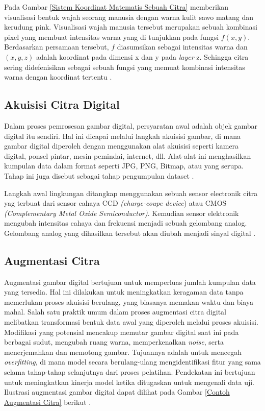     
    
    Pada Gambar \ref{Sistem Koordinat Matematis Sebuah Citra} memberikan visualisasi bentuk wajah seorang manusia dengan warna kulit sawo matang dan kerudung pink. Visualisasi wajah manusia tersebut merupakan sebuah kombinasi pixel yang membuat intensitas warna yang di tunjukkan pada fungsi $f(x,y)$. Berdasarkan persamaan tersebut, $f$ diasumsikan sebagai intensitas warna dan $(x,y,z)$ adalah koordinat pada dimensi x dan y pada \textit{layer} z. Sehingga citra sering didefenisikan sebagai sebuah fungsi yang memuat kombinasi intensitas warna dengan koordinat tertentu \cite{Kirana2021}.

\subsection{Akuisisi Citra  Digital}

    Dalam proses pemrosesan gambar digital, persyaratan awal adalah objek gambar digital itu sendiri. Hal ini dicapai melalui langkah akuisisi gambar, di mana gambar digital diperoleh dengan menggunakan alat akuisisi seperti kamera digital, ponsel pintar, mesin pemindai, internet, dll. Alat-alat ini menghasilkan kumpulan data dalam format seperti JPG, PNG, Bitmap, atau yang serupa. Tahap ini juga disebut sebagai tahap pengumpulan dataset \cite{Dewi2018}.
    
    
    Langkah awal lingkungan ditangkap menggunakan sebuah sensor electronik citra yag terbuat dari sensor cahaya CCD \textit{(charge-coupe device}) atau CMOS \textit{(Complementary Metal Oxide Semiconductor)}. Kemudian sensor elektronik mengubah intensitas cahaya dan frekuensi menjadi sebuah gelombang analog. Gelombang analog yang dihasilkan tersebut akan diubah menjadi sinyal digital \cite{putra2010pengolahan}.

\subsection{Augmentasi Citra }

    Augmentasi gambar digital bertujuan untuk memperluas jumlah kumpulan data yang tersedia. Hal ini dilakukan untuk meningkatkan keragaman data tanpa memerlukan proses akuisisi berulang, yang biasanya memakan waktu dan biaya mahal. Salah satu praktik umum dalam proses augmentasi citra digital melibatkan transformasi bentuk data awal yang diperoleh melalui proses akuisisi. Modifikasi yang potensial mencakup memutar gambar digital saat ini pada berbagai sudut, mengubah ruang warna, memperkenalkan \textit{noise}, serta menerjemahkan dan memotong gambar. Tujuannya adalah untuk mencegah \textit{overfitting}, di mana model secara berulang-ulang mengidentifikasi fitur yang sama selama tahap-tahap selanjutnya dari proses pelatihan. Pendekatan ini bertujuan untuk meningkatkan kinerja model ketika ditugaskan untuk mengenali data uji. Ilustrasi augmentasi gambar digital dapat dilihat pada Gambar \ref{Contoh Augmentasi Citra} berikut \cite{Shorten2019, shorten2019survey}.

